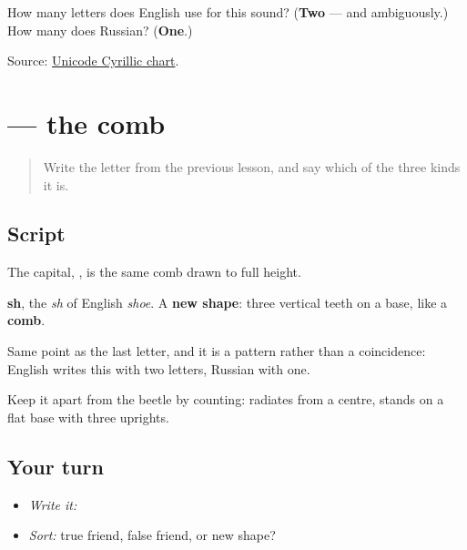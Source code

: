 \begin{tcolorbox}[breakable,colback=teal!4,colframe=teal!35!black,title={Before you move on}]
How many letters does English use for this sound? (\textbf{Two} — and ambiguously.) How many does Russian? (\textbf{One}.)

Source: \href{https://www.unicode.org/charts/PDF/U0400.pdf}{Unicode Cyrillic chart}.
\end{tcolorbox}
\section[\texorpdfstring{\ru{ш} (sh)}{ш (sh)}]{ — the comb}

\label{lesson:RU-W06-sh}



\begin{quote}
Write the letter from the previous lesson, and say which of the three kinds it is.
\end{quote}

\subsection*{Script}

\begin{quote}
   
\end{quote}

The capital, \textbf{}, is the same comb drawn to full height.

\textbf{sh}, the \emph{sh} of English \emph{shoe}. A \textbf{new shape}: three vertical teeth on a base, like a \textbf{comb}.

Same point as the last letter, and it is a pattern rather than a coincidence: English writes this with two letters, Russian with one.

Keep it apart from the beetle by counting: \textbf{} radiates from a centre, \textbf{} stands on a flat base with three uprights.

\subsection*{Your turn}
\begin{itemize}
\raggedright
  \item \emph{Write it:} 
  \item \emph{Sort:} true friend, false friend, or new shape?
\end{itemize}

